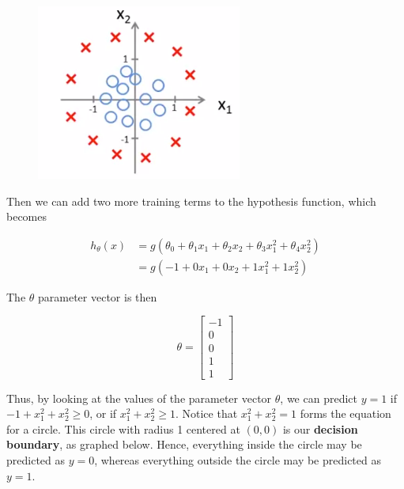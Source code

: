 \begin{figure}[hbt!]
    \centering
    \includegraphics{Resources/Decision_Boundary}
\end{figure}

\noindent Then we can add two more training terms to the hypothesis function, which becomes

\begin{align*}
    h_{\theta}(x)   &= g(\theta_0 + \theta_1 x_1 + \theta_2 x_2 + \theta_3 x_1^2 + \theta_4 x_2^2) \\
    &= g(-1 + 0x_1 + 0x_2 + 1x_1^2 + 1x_2^2)
\end{align*}

\noindent The $\theta$ parameter vector is then

\begin{equation*}
    \theta =
    \begin{bmatrix}
        -1 \\
        0 \\
        0 \\
        1 \\
        1
    \end{bmatrix}
\end{equation*}

\noindent Thus, by looking at the values of the parameter vector $\theta$, we can predict $y=1$ if
$-1+x_1^2 + x_2^2\geq 0$, or if $x_1^2+x_2^2\geq 1$. Notice that $x_1^2+x_2^2=1$ forms the equation
for a circle. This circle with radius 1 centered at $(0,0)$ is our \textbf{decision boundary}, as
graphed below. Hence, everything inside the circle may be predicted as $y=0$, whereas everything
outside the circle may be predicted as $y=1$.

